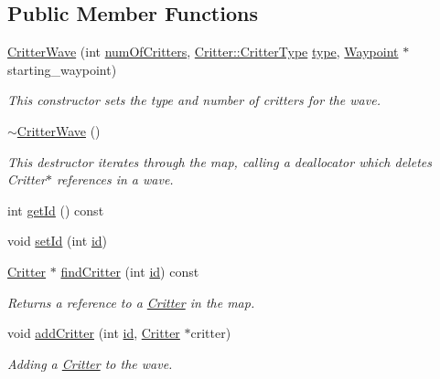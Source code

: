 \subsection*{Public Member Functions}
\begin{DoxyCompactItemize}
\item 
\hyperlink{class_critter_wave_a1364e3a7f9f4ab379847fe558b1fb233}{Critter\+Wave} (int \hyperlink{class_critter_wave_a6c8edb08492ed068c5e4c5323695c29d}{num\+Of\+Critters}, \hyperlink{class_critter_acda8a5c3234b66101e0546d75d6f90f1}{Critter\+::\+Critter\+Type} \hyperlink{class_critter_wave_aaf7c97d4f340ffa811ca452745ef6b24}{type}, \hyperlink{class_waypoint}{Waypoint} $\ast$starting\+\_\+waypoint)
\begin{DoxyCompactList}\small\item\em This constructor sets the type and number of critters for the wave. \end{DoxyCompactList}\item 
\hyperlink{class_critter_wave_a89e6acba97071ff44a9493315a8f073b}{$\sim$\+Critter\+Wave} ()
\begin{DoxyCompactList}\small\item\em This destructor iterates through the map, calling a deallocator which deletes Critter$\ast$ references in a wave. \end{DoxyCompactList}\item 
int \hyperlink{class_critter_wave_a127a4cc493bb6c6afcee3f394715b90d}{get\+Id} () const 
\item 
void \hyperlink{class_critter_wave_afcd7e16f4363b4be3be5649ef8325f55}{set\+Id} (int \hyperlink{class_critter_wave_aa476fc7af49dfb42fce07da5e726bbb2}{id})
\item 
\hyperlink{class_critter}{Critter} $\ast$ \hyperlink{class_critter_wave_a1244e59ebd702edd2530e6256779ace0}{find\+Critter} (int \hyperlink{class_critter_wave_aa476fc7af49dfb42fce07da5e726bbb2}{id}) const 
\begin{DoxyCompactList}\small\item\em Returns a reference to a \hyperlink{class_critter}{Critter} in the map. \end{DoxyCompactList}\item 
void \hyperlink{class_critter_wave_a3c6dcf79b57cb7e208471c5bc387f22d}{add\+Critter} (int \hyperlink{class_critter_wave_aa476fc7af49dfb42fce07da5e726bbb2}{id}, \hyperlink{class_critter}{Critter} $\ast$critter)
\begin{DoxyCompactList}\small\item\em Adding a \hyperlink{class_critter}{Critter} to the wave. \end{DoxyCompactList}\item 

\end{DoxyCompactItemize}
